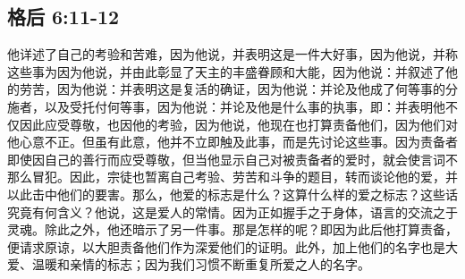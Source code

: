
\subsection{格后 6:11-12}

\par

他详述了自己的考验和苦难，因为他说，并表明这是一件大好事，因为他说，并称这些事为因为他说，并由此彰显了天主的丰盛眷顾和大能，因为他说：并叙述了他的劳苦，因为他说：并表明这是复活的确证，因为他说：并论及他成了何等事的分施者，以及受托付何等事，因为他说：并论及他是什么事的执事，即：并表明他不仅因此应受尊敬，也因他的考验，因为他说，他现在也打算责备他们，因为他们对他心意不正。但虽有此意，他并不立即触及此事，而是先讨论这些事。因为责备者即使因自己的善行而应受尊敬，但当他显示自己对被责备者的爱时，就会使言词不那么冒犯。因此，宗徒也暂离自己考验、劳苦和斗争的题目，转而谈论他的爱，并以此击中他们的要害。那么，他爱的标志是什么？这算什么样的爱之标志？这些话究竟有何含义？他说，这是爱人的常情。因为正如握手之于身体，语言的交流之于灵魂。除此之外，他还暗示了另一件事。那是怎样的呢？即因为此后他打算责备，便请求原谅，以大胆责备他们作为深爱他们的证明。此外，加上他们的名字也是大爱、温暖和亲情的标志；因为我们习惯不断重复所爱之人的名字。\par

